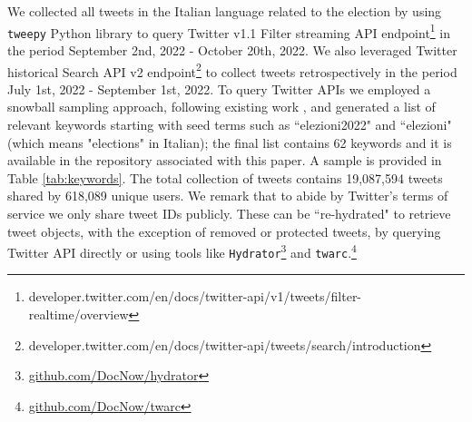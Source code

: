 \documentclass[sigconf,screen]{acmart}
\begin{document}
We collected all tweets in the Italian language related to the election by using \texttt{tweepy} Python library to query Twitter v1.1 Filter streaming API endpoint\footnote{developer.twitter.com/en/docs/twitter-api/v1/tweets/filter-realtime/overview} in the period September 2nd, 2022 - October 20th, 2022. We also leveraged Twitter historical Search API v2 endpoint\footnote{developer.twitter.com/en/docs/twitter-api/tweets/search/introduction} to collect tweets retrospectively in the period July 1st, 2022 - September 1st, 2022. To query Twitter APIs we employed a snowball sampling approach, following existing work \cite{di2022vaccineu,deverna2021covaxxy}, and generated a list of relevant keywords starting with seed terms such as ``elezioni2022" and ``elezioni"(which means "elections" in Italian); the final list contains 62 keywords and it is available in the repository associated with this paper. A sample is provided in Table \ref{tab:keywords}. The total collection of tweets contains 19,087,594 tweets shared by 618,089 unique users. We remark that to abide by Twitter's terms of service we only share tweet IDs publicly. These can be ``re-hydrated" to retrieve tweet objects, with the exception of removed or protected tweets, by querying Twitter API directly or using tools like \texttt{Hydrator}\footnote{\url{github.com/DocNow/hydrator}} and \texttt{twarc}.\footnote{\url{github.com/DocNow/twarc}}


\end{document}
